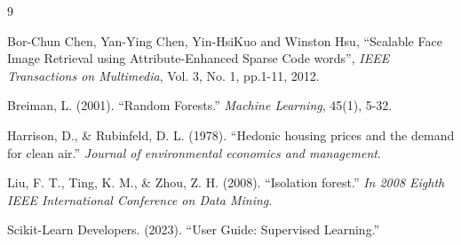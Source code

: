 \documentclass[12pt,a4paper]{report}
\begin{document}
\begin{thebibliography}{9}

Bor-Chun Chen, Yan-Ying Chen, Yin-HsiKuo and Winston Hsu,
``Scalable Face Image Retrieval using Attribute-Enhanced Sparse Code words'',
\textit{IEEE Transactions on Multimedia}, Vol. 3, No. 1, pp.1-11, 2012.

Breiman, L. (2001). ``Random Forests.'' \textit{Machine Learning}, 45(1), 5-32.

Harrison, D., \& Rubinfeld, D. L. (1978). ``Hedonic housing prices and the demand for clean air.'' \textit{Journal of environmental economics and management}.

Liu, F. T., Ting, K. M., \& Zhou, Z. H. (2008). ``Isolation forest.'' \textit{In 2008 Eighth IEEE International Conference on Data Mining}.

Scikit-Learn Developers. (2023). ``User Guide: Supervised Learning.''

\end{thebibliography}
\end{document}
